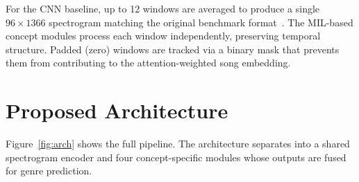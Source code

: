\documentclass[sigconf,nonacm]{acmart}
\begin{document}
For the CNN baseline, up to 12 windows are averaged to produce a single $96\times1366$
spectrogram matching the original benchmark format~\cite{hershey2017cnn}. The MIL-based concept
modules process each window independently, preserving temporal structure. Padded (zero) windows
are tracked via a binary mask that prevents them from contributing to the attention-weighted
song embedding.

\section{Proposed Architecture}

Figure~\ref{fig:arch} shows the full pipeline. The architecture separates into a shared
spectrogram encoder and four concept-specific modules whose outputs are fused for genre
prediction.
\end{document}
